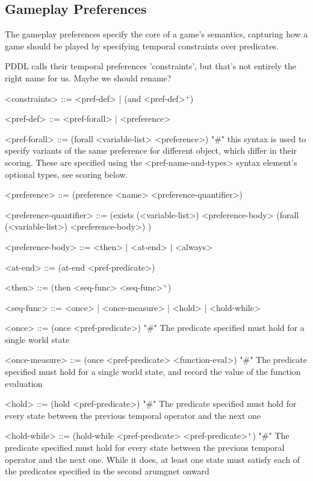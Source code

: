 \documentclass{article}
\begin{document}
\subsection{Gameplay Preferences}
The gameplay preferences specify the core of a game's semantics, capturing how a game should be played by specifying temporal constraints over predicates. 
        
        PDDL calls their temporal preferences 'constraints', but that's not entirely the right name for us. Maybe we should rename? \\
        
\begin{grammar}
<constraints> ::= <pref-def> | (and <pref-def>$^+$)
    
<pref-def> ::= <pref-forall> | <preference> 

<pref-forall> ::= (forall <variable-list> <preference>) "#" this syntax is used to specify variants of the same preference for different object, which differ in their scoring. These are specified using the <pref-name-and-types> syntax element's optional types, see scoring below.
    
<preference> ::= (preference <name> <preference-quantifier>)

<preference-quantifier> ::= (exists (<variable-list>) <preference-body> 
\alt  (forall (<variable-list>) <preference-body>)
) 

<preference-body> ::=  <then> | <at-end> | <always> 

<at-end> ::= (at-end <pref-predicate>)

<then> ::= (then <seq-func> <seq-func>$^+$) 

<seq-func> ::= <once> | <once-measure> | <hold> | <hold-while>

<once> ::= (once <pref-predicate>) "#" The predicate specified must hold for a single world state

{ \color{teal} <once-measure> ::= (once <pref-predicate> <function-eval>) "#" The predicate specified must hold for a single world state, and record the value of the function evaluation }

<hold> ::= (hold <pref-predicate>) "#" The predicate specified must hold for every state between the previous temporal operator and the next one

<hold-while> ::= (hold-while <pref-predicate> <pref-predicate>$^+$) "#" The predicate specified must hold for every state between the previous temporal operator and the next one. While it does, at least one state must satisfy each of the predicates specified in the second arumgnet onward


\end{grammar}
\end{document}
